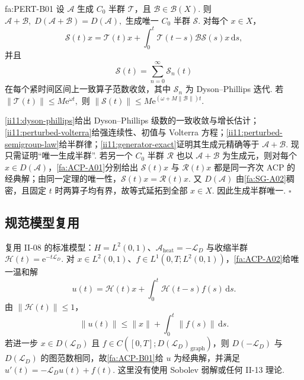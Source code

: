 \begin{FATheorem}[B][有界扰动定理]{fa:PERT-B01}
设 \(\displaystyle\mathcal A\) 生成 \(\displaystyle C_0\) 半群 \(\displaystyle\mathcal T\)，且 \(\displaystyle\mathcal B\in\mathcal B(X)\). 则 \(\displaystyle \mathcal A+\mathcal B, \; D(\mathcal A+\mathcal B)=D(\mathcal A),\)
生成唯一 \(\displaystyle C_0\) 半群 \(\displaystyle\mathcal S\). 对每个 \(\displaystyle x\in X\)，
\[
\mathcal S(t)x
=
\mathcal T(t)x
+
\int_0^t\mathcal T(t-s)\mathcal B\mathcal S(s)x\,\mathrm{d}s,
\]
并且
\[
\mathcal S(t)
=
\sum_{n=0}^{\infty}\mathcal S_n(t)
\]
在每个紧时间区间上一致算子范数收敛，其中 \(\displaystyle\mathcal S_n\) 为 Dyson--Phillips 迭代. 若 \(\displaystyle \|\mathcal T(t)\| \leqslant M\mathrm{e}^{\omega t},\)
则 \(\displaystyle \|\mathcal S(t)\| \leqslant M\mathrm{e}^{(\omega+M\|\mathcal B\|)t}.\)
\end{FATheorem}

\begin{FAProof}
\par\noindent\autoref{ii11:dyson-phillips}给出 Dyson--Phillips 级数的一致收敛与增长估计；\autoref{ii11:perturbed-volterra}给强连续性、初值与 Volterra 方程；\autoref{ii11:perturbed-semigroup-law}给半群律；\autoref{ii11:generator-exact}证明其生成元精确等于 \(\displaystyle\mathcal A+\mathcal B\). 现只需证明“唯一生成半群”. 若另一个 \(\displaystyle C_0\) 半群 \(\displaystyle\mathcal R\) 也以 \(\displaystyle\mathcal A+\mathcal B\) 为生成元，则对每个 \(\displaystyle x\in D(\mathcal A)\)，\autoref{fa:ACP-A01}分别给出 \(\displaystyle\mathcal S(t)x\) 与 \(\displaystyle\mathcal R(t)x\) 都是同一齐次 ACP 的经典解；由同一定理的唯一性，\(\displaystyle\mathcal S(t)x=\mathcal R(t)x\). 又 \(\displaystyle D(\mathcal A)\) 由\autoref{fa:SG-A02}稠密，且固定 \(\displaystyle t\) 时两算子均有界，故等式延拓到全部 \(\displaystyle x\in X\). 因此生成半群唯一.
\hfill\(\square\)
\end{FAProof}

\subsection{规范模型复用}

\begin{FAApplication}[受迫热演化]
复用 II-08 的标准模型：\(\displaystyle H=L^2(0,1)\)、\(\displaystyle\mathcal A_{\mathrm{heat}}=-\mathcal L_D\) 与收缩半群 \(\displaystyle \mathcal H(t)=\mathrm{e}^{-t\mathcal L_D}.\)
对 \(\displaystyle x\in L^2(0,1)\)、\(\displaystyle f\in L^1(0,T;L^2(0,1))\)，\autoref{fa:ACP-A02}给唯一温和解
\[
u(t)
=
\mathcal H(t)x
+
\int_0^t\mathcal H(t-s)f(s)\,\mathrm{d}s.
\]
由 \(\displaystyle\|\mathcal H(t)\|\leqslant1\)，
\[
\|u(t)\|
\leqslant
\|x\|+
\int_0^t\|f(s)\|\,\mathrm{d}s.
\]
若进一步 \(\displaystyle x\in D(\mathcal L_D)\) 且 \(\displaystyle f\in C([0,T];D(\mathcal L_D)_{\mathrm{graph}})\)，则 \(\displaystyle D(-\mathcal L_D)\) 与 \(\displaystyle D(\mathcal L_D)\) 的图范数相同，故\autoref{fa:ACP-B01}给 \(\displaystyle u\) 为经典解，并满足 \(\displaystyle u'(t)=-\mathcal L_Du(t)+f(t).\)
这里没有使用 Sobolev 弱解或任何 II-13 理论.
\end{FAApplication}

